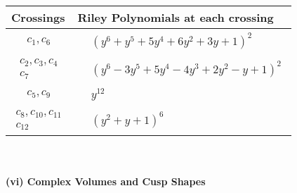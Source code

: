 \documentclass[1p]{elsarticle_modified}
\theoremstyle{definition}
\begin{document}
\begin{tabular}{m{50pt}|m{274pt}}
Crossings & \hspace{64pt}Riley Polynomials at each crossing \\
\hline $$\begin{aligned}c_{1},c_{6}\end{aligned}$$&$\begin{aligned}
&(y^6+y^5+5 y^4+6 y^2+3 y+1)^2
\end{aligned}$\\
\hline $$\begin{aligned}c_{2},c_{3},c_{4}\\c_{7}\end{aligned}$$&$\begin{aligned}
&(y^6-3 y^5+5 y^4-4 y^3+2 y^2- y+1)^2
\end{aligned}$\\
\hline $$\begin{aligned}c_{5},c_{9}\end{aligned}$$&$\begin{aligned}
&y^{12}
\end{aligned}$\\
\hline $$\begin{aligned}c_{8},c_{10},c_{11}\\c_{12}\end{aligned}$$&$\begin{aligned}
&(y^2+y+1)^6
\end{aligned}$\\
\hline
\end{tabular}\\~\\
\newpage\flushleft \textbf{(vi) Complex Volumes and Cusp Shapes}
\end{document}
